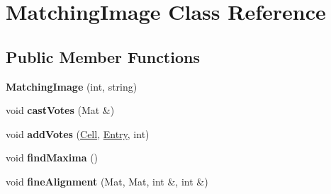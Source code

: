 \hypertarget{classMatchingImage}{\section{\-Matching\-Image \-Class \-Reference}
\label{classMatchingImage}
}
\subsection*{\-Public \-Member \-Functions}
\begin{DoxyCompactItemize}
\item 
\hypertarget{classMatchingImage_a56099f7ece98c96062e16fe24fdcfe85}{{\bfseries \-Matching\-Image} (int, string)}\label{classMatchingImage_a56099f7ece98c96062e16fe24fdcfe85}

\item 
\hypertarget{classMatchingImage_a9b37df20ee22da8f0fc5b6dce1fc452e}{void {\bfseries cast\-Votes} (\-Mat \&)}\label{classMatchingImage_a9b37df20ee22da8f0fc5b6dce1fc452e}

\item 
\hypertarget{classMatchingImage_aad29ba5d24382051784e5a19edcad69d}{void {\bfseries add\-Votes} (\hyperlink{classCell}{\-Cell}, \hyperlink{classEntry}{\-Entry}, int)}\label{classMatchingImage_aad29ba5d24382051784e5a19edcad69d}

\item 
\hypertarget{classMatchingImage_ad32e697a01f3a18103192918f856dfd6}{void {\bfseries find\-Maxima} ()}\label{classMatchingImage_ad32e697a01f3a18103192918f856dfd6}

\item 
\hypertarget{classMatchingImage_a79f66ca5dc56f8566dde276e1340a961}{void {\bfseries fine\-Alignment} (\-Mat, \-Mat, int \&, int \&)}\label{classMatchingImage_a79f66ca5dc56f8566dde276e1340a961}

\end{DoxyCompactItemize}
